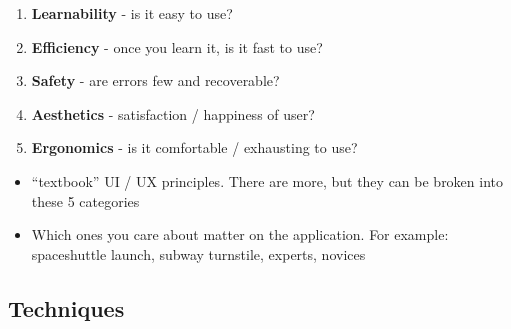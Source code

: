 \begin{enumerate}[1.]
\item
  \textbf{Learnability} - is it easy to use?
\item
  \textbf{Efficiency} - once you learn it, is it fast to use?
\item
  \textbf{Safety} - are errors few and recoverable?
\item
  \textbf{Aesthetics} - satisfaction / happiness of user?
\item
  \textbf{Ergonomics} - is it comfortable / exhausting to use?
\end{enumerate}
\begin{itemize}
\item
  ``textbook'' UI / UX principles. There are more, but they can be
  broken into these 5 categories
\item
  Which ones you care about matter on the application. For example:
  spaceshuttle launch, subway turnstile, experts, novices
\end{itemize}
\subsection{Techniques}

